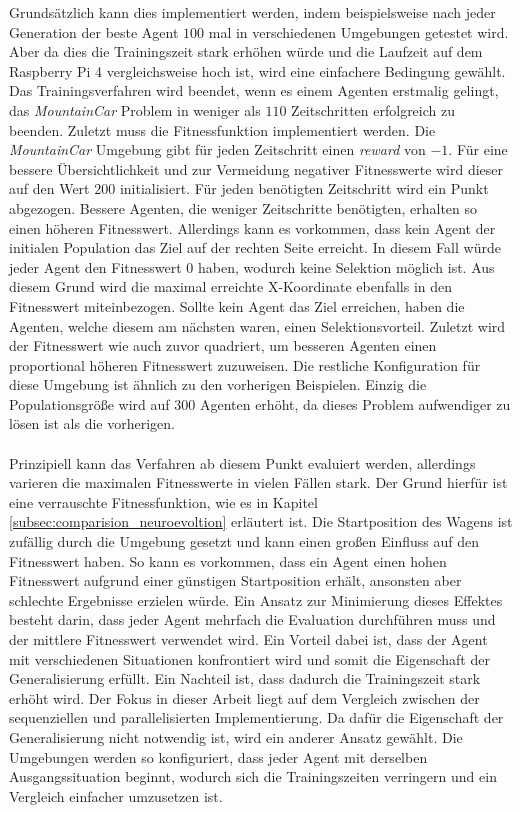 Grundsätzlich kann dies implementiert werden, indem beispielsweise nach jeder Generation der beste Agent $100$ mal in verschiedenen Umgebungen getestet wird. Aber da dies die Trainingszeit stark erhöhen würde und die Laufzeit auf dem Raspberry Pi 4 vergleichsweise hoch ist, wird eine einfachere Bedingung gewählt. Das Trainingsverfahren wird beendet, wenn es einem Agenten erstmalig gelingt, das \emph{MountainCar} Problem in weniger als $110$ Zeitschritten erfolgreich zu beenden. Zuletzt muss die Fitnessfunktion implementiert werden. Die \emph{MountainCar} Umgebung gibt für jeden Zeitschritt einen \emph{reward} von $-1$. Für eine bessere Übersichtlichkeit und zur Vermeidung negativer Fitnesswerte wird dieser auf den Wert $200$ initialisiert. Für jeden benötigten Zeitschritt wird ein Punkt abgezogen. Bessere Agenten, die weniger Zeitschritte benötigten, erhalten so einen höheren Fitnesswert. Allerdings kann es vorkommen, dass kein Agent der initialen Population das Ziel auf der rechten Seite erreicht. In diesem Fall würde jeder Agent den Fitnesswert $0$ haben, wodurch keine Selektion möglich ist. Aus diesem Grund wird die maximal erreichte X-Koordinate ebenfalls in den Fitnesswert miteinbezogen. Sollte kein Agent das Ziel erreichen, haben die Agenten, welche diesem am nächsten waren, einen Selektionsvorteil. Zuletzt wird der Fitnesswert wie auch zuvor quadriert, um besseren Agenten einen proportional höheren Fitnesswert zuzuweisen. Die restliche Konfiguration für diese Umgebung ist ähnlich zu den vorherigen Beispielen. Einzig die Populationsgröße wird auf $300$ Agenten erhöht, da dieses Problem aufwendiger zu lösen ist als die vorherigen.
\\\\
Prinzipiell kann das Verfahren ab diesem Punkt evaluiert werden, allerdings varieren die maximalen Fitnesswerte in vielen Fällen stark. Der Grund hierfür ist eine verrauschte Fitnessfunktion, wie es in Kapitel \ref{subsec:comparision_neuroevoltion} erläutert ist. Die Startposition des Wagens ist zufällig durch die Umgebung gesetzt und kann einen großen Einfluss auf den Fitnesswert haben. So kann es vorkommen, dass ein Agent einen hohen Fitnesswert aufgrund einer günstigen Startposition erhält, ansonsten aber schlechte Ergebnisse erzielen würde. Ein Ansatz zur Minimierung dieses Effektes besteht darin, dass jeder Agent mehrfach die Evaluation durchführen muss und der mittlere Fitnesswert verwendet wird. Ein Vorteil dabei ist, dass der Agent mit verschiedenen Situationen konfrontiert wird und somit die Eigenschaft der Generalisierung erfüllt. Ein Nachteil ist, dass dadurch die Trainingszeit stark erhöht wird. Der Fokus in dieser Arbeit liegt auf dem Vergleich zwischen der sequenziellen und parallelisierten Implementierung. Da dafür die Eigenschaft der Generalisierung nicht notwendig ist, wird ein anderer Ansatz gewählt. Die Umgebungen werden so konfiguriert, dass jeder Agent mit derselben Ausgangssituation beginnt, wodurch sich die Trainingszeiten verringern und ein Vergleich einfacher umzusetzen ist.
